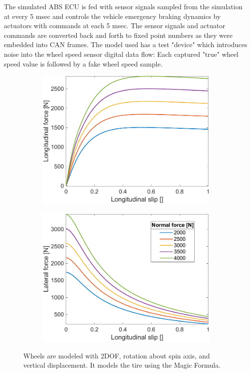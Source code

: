 \documentclass[a4paper, fleqn]{template/cas-dc}
\begin{document}
	The simulated ABS ECU is fed with sensor signals sampled from the simulation at every 5 msec and controls the vehicle emergency braking dynamics by actuators with commands at each 5 msec. The sensor signals and actuator commands are converted back and forth to fixed point numbers as they were embedded into CAN frames. The model used has a test "device" which introduces noise into the wheel speed sensor digital data flow: Each captured "true" wheel speed value is followed by a fake wheel speed sample.
		
	\begin{figure}[ht]
		\centering
		\begin{subfigure}[b]{0.48\columnwidth}
			\centering
			\includegraphics[width=\linewidth]{figures/LongitudinalForce_slip.pdf}
		\end{subfigure}
		\begin{subfigure}[b]{0.48\columnwidth}
			\centering
			\includegraphics[width=\linewidth]{figures/LateralForce_slip.pdf}
		\end{subfigure}
		\caption{Wheels are modeled with 2DOF, rotation about spin axis, and vertical displacement. It models the tire using the Magic Formula.\cite{pacejka2005tire}}
		\label{FIG:WheelSlips}
	\end{figure}
			
\end{document}
